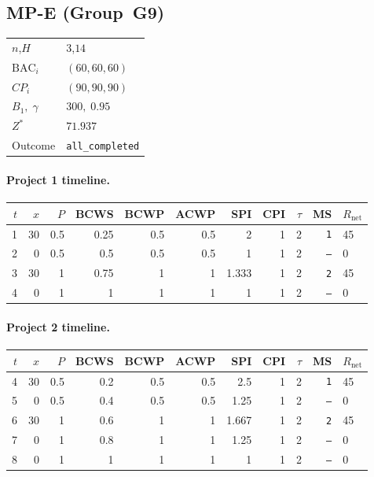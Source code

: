 \documentclass[12pt, a4paper]{article}
\newcommand{\BAC}{\mathrm{BAC}}
\begin{document}
\newpage

\subsection*{MP-E  (Group~G9)}
\begin{center}
\begin{tabular}{ll}
\toprule
$n$,\;$H$ & $3$,\;$14$ \\
$\BAC_i$ & $(60, 60, 60)$ \\
$CP_i$   & $(90, 90, 90)$ \\
$B_1,\;\gamma$ & $300,\;0.95$ \\
$Z^*$ & $71.937$ \\
Outcome & \texttt{all_completed} \\
\bottomrule
\end{tabular}
\end{center}

\paragraph{Project 1 timeline.}
\begin{center}
\begin{tabular}{rrrrrrrrrrl}
\toprule
$t$ & $x$ & $P$ & BCWS & BCWP & ACWP & SPI & CPI & $\tau$ & MS & $R_{\mathrm{net}}$\\
\midrule
1 & 30 & 0.5 & 0.25 & 0.5 & 0.5 & 2 & 1 & 2 & \texttt{1} & 45 \\
2 & 0 & 0.5 & 0.5 & 0.5 & 0.5 & 1 & 1 & 2 & \texttt{---} & 0 \\
3 & 30 & 1 & 0.75 & 1 & 1 & 1.333 & 1 & 2 & \texttt{2} & 45 \\
4 & 0 & 1 & 1 & 1 & 1 & 1 & 1 & 2 & \texttt{---} & 0 \\
\bottomrule
\end{tabular}
\end{center}
\paragraph{Project 2 timeline.}
\begin{center}
\begin{tabular}{rrrrrrrrrrl}
\toprule
$t$ & $x$ & $P$ & BCWS & BCWP & ACWP & SPI & CPI & $\tau$ & MS & $R_{\mathrm{net}}$\\
\midrule
4 & 30 & 0.5 & 0.2 & 0.5 & 0.5 & 2.5 & 1 & 2 & \texttt{1} & 45 \\
5 & 0 & 0.5 & 0.4 & 0.5 & 0.5 & 1.25 & 1 & 2 & \texttt{---} & 0 \\
6 & 30 & 1 & 0.6 & 1 & 1 & 1.667 & 1 & 2 & \texttt{2} & 45 \\
7 & 0 & 1 & 0.8 & 1 & 1 & 1.25 & 1 & 2 & \texttt{---} & 0 \\
8 & 0 & 1 & 1 & 1 & 1 & 1 & 1 & 2 & \texttt{---} & 0 \\
\bottomrule
\end{tabular}
\end{center}
\end{document}
